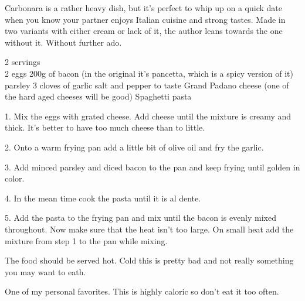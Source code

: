 \documentclass[../../../book.tex]{subfiles}
\begin{document}
Carbonara is a rather heavy dish, but it's perfect to whip up on a quick date when you know your partner enjoys Italian cuisine and strong tastes. Made in two variants with either cream or lack of it, the author leans towards the one without it. Without further ado.


2 servings \\

2 eggs
200g of bacon (in the original it's pancetta, which is a spicy version of it)
parsley
3 cloves of garlic
salt and pepper to taste
Grand Padano cheese (one of the hard aged cheeses will be good)
Spaghetti pasta


1. Mix the eggs with grated cheese. Add cheese until the mixture is creamy and thick. It's better to have too much cheese than to little.

2. Onto a warm frying pan add a little bit of olive oil and fry the garlic. 

3. Add minced parsley and diced bacon to the pan and keep frying until golden in color. 

4. In the mean time cook the pasta until it is al dente.

5. Add the pasta to the frying pan and mix until the bacon is evenly mixed throughout. Now make sure that the heat isn't too large. On small heat add the mixture from step 1 to the pan while mixing.

The food should be served hot. Cold this is pretty bad and not really something you may want to eath.


One of my personal favorites. This is highly caloric so don't eat it too often.
\end{document}
